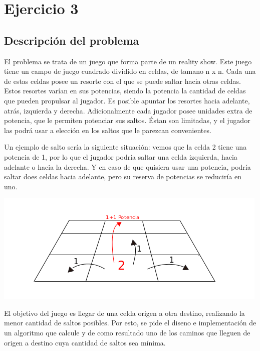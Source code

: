 \section{Ejercicio 3}

\subsection{Descripci\'on del problema} \label{ej_3:descripcion}

El problema se trata de un juego que forma parte de un reality show. Este juego tiene un campo de juego cuadrado dividido en celdas, de tamano n x n. Cada una de estas celdas posee un resorte con el que se puede saltar hacia otras celdas. Estos resortes var\'ian en sus potencias, siendo la potencia la cantidad de celdas que pueden propulsar al jugador. Es posible apuntar los resortes hacia adelante, atr\'as, izquierda y derecha. Adicionalmente cada jugador posee unidades extra de potencia, que le permiten potenciar sus saltos.  \'Estan son limitadas, y el jugador las podr\'a usar a elecci\'on en los saltos que le parezcan convenientes.

\vspace{2mm}

Un ejemplo de salto ser\'ia la siguiente situaci\'on: vemos que la celda 2 tiene una potencia de 1, por lo que el jugador podr\'ia saltar una celda izquierda, hacia adelante o hacia la derecha. Y en caso de que quisiera usar una potencia, podr\'ia saltar does celdas hacia adelante, pero su reserva de potencias se reducir\'ia en uno.
 \vspace{2mm}
\begin{center}
\includegraphics[scale=0.9]{images/saltos}
\end{center}
El objetivo del juego es llegar de una celda origen a otra destino, realizando la menor cantidad de saltos posibles. Por esto, se pide el diseno e implementaci\'on de un algoritmo que calcule y de como resultado uno de los caminos que lleguen de origen a destino cuya cantidad de saltos sea m\'inima.
\vspace{2mm}


